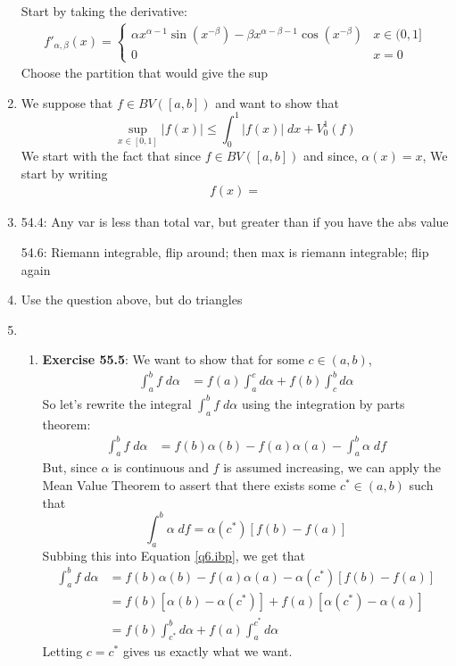 \documentclass[12pt]{article}
\theoremstyle{plain}
\theoremstyle{definition}
\theoremstyle{remark}
\begin{document}
\begin{enumerate}
Start by taking the derivative:
\begin{align*}
    f'_{\alpha, \beta}(x) = 
        \begin{cases} 
            \alpha x^{\alpha-1}\sin(x^{-\beta}) -
            \beta x^{\alpha-\beta-1}\cos(x^{-\beta}) & 
            x\in(0,1] \\
            0 & x=0
        \end{cases}
\end{align*}
Choose the partition that would give the sup
        

\item We suppose that $f\in BV([a,b])$ and want to show that
    \[ \sup_{x\in[0,1]} |f(x)| \leq \int^1_0 |f(x)|\;dx
        + V^1_0(f) \]
We start with the fact that since $f\in BV([a,b])$ and since, $\alpha(x)=x$, We start by writing
\begin{align*}
    f(x) = 
\end{align*}

\item 54.4: Any var is less than total var, but greater than if you have the abs value

54.6: Riemann integrable, flip around; then max is riemann integrable; flip again

\item Use the question above, but do triangles

\item 
\begin{enumerate}
\item \textbf{Exercise 55.5}: We want to show that for some $c\in(a,b)$,
\begin{align*}
    \int^b_a f\;d\alpha &= f(a)\int^c_a d\alpha 
        + f(b) \int^b_c d\alpha 
\end{align*}
So let's rewrite the integral $\int^b_a f\;d\alpha$ using the integration by parts theorem:
\begin{align}
    \label{q6.ibp}
    \int^b_a f\;d\alpha  
        &= f(b) \alpha(b) - f(a)\alpha(a) - \int^b_a\alpha \; df
\end{align}
But, since $\alpha$ is continuous and $f$ is assumed increasing, we can apply the Mean Value Theorem to assert that there exists some $c^*\in(a,b)$ such that 
\begin{equation}
    \int^b_a \alpha\;df = \alpha(c^*)[f(b)-f(a)]
\end{equation}
Subbing this into Equation \ref{q6.ibp}, we get that
\begin{align*}
    \int^b_a f\;d\alpha  
        &= f(b) \alpha(b)-f(a)\alpha(a)-\alpha(c^*)[f(b)-f(a)]\\
        &= f(b) \left[\alpha(b)-\alpha(c^*)\right]
            + f(a)\left[\alpha(c^*)-\alpha(a)\right]\\
        &= f(b) \int^b_{c^*} d\alpha
            + f(a)\int^{c^*}_a d\alpha
\end{align*}
Letting $c=c^*$ gives us exactly what we want.
\end{enumerate}



    
        
        

\end{enumerate}
\end{document}
